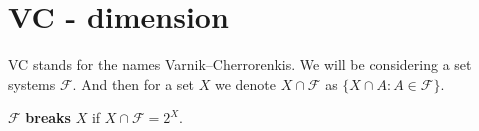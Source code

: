 \chapter{VC - dimension}

VC stands for the names Varnik--Cherrorenkis. We will be considering a set systems $\mathcal{F}$. And then for a set $X$ we denote $X \cap \mathcal{F}$ as $\{X \cap A : A \in \mathcal{F}\}$.

\begin{defn}
	$\mathcal{F}$ \textbf{breaks} $X$ if $X \cap \mathcal{F} = 2^{X}$.
\end{defn}

